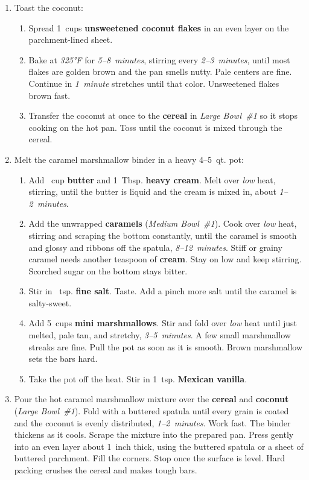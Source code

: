 \documentclass[11pt,letterpaper]{article}
\begin{document}
\begin{enumerate}
    \item Toast the coconut:
    \begin{enumerate}
        \item Spread 1~cups \textbf{unsweetened coconut flakes} in an even layer on the parchment-lined sheet.
        \item Bake at \textit{325°F} for \textit{5--8~minutes}, stirring every \textit{2--3~minutes}, until most flakes are golden brown and the pan smells nutty. Pale centers are fine. Continue in \textit{1~minute} stretches until that color. Unsweetened flakes brown fast.
        \item Transfer the coconut at once to the \textbf{cereal} in \textit{Large Bowl~\#1} so it stops cooking on the hot pan. Toss until the coconut is mixed through the cereal.
    \end{enumerate}

    \item Melt the caramel marshmallow binder in a heavy 4--5~qt. pot:
    \begin{enumerate}
        \item Add ~cup \textbf{butter} and 1~Tbsp. \textbf{heavy cream}. Melt over \textit{low} heat, stirring, until the butter is liquid and the cream is mixed in, about \textit{1--2~minutes}.
        \item Add the unwrapped \textbf{caramels} (\textit{Medium Bowl~\#1}). Cook over \textit{low} heat, stirring and scraping the bottom constantly, until the caramel is smooth and glossy and ribbons off the spatula, \textit{8--12~minutes}. Stiff or grainy caramel needs another teaspoon of \textbf{cream}. Stay on low and keep stirring. Scorched sugar on the bottom stays bitter.
        \item Stir in ~tsp. \textbf{fine salt}. Taste. Add a pinch more salt until the caramel is salty-sweet.
        \item Add 5~cups \textbf{mini marshmallows}. Stir and fold over \textit{low} heat until just melted, pale tan, and stretchy, \textit{3--5~minutes}. A few small marshmallow streaks are fine. Pull the pot as soon as it is smooth. Brown marshmallow sets the bars hard.
        \item Take the pot off the heat. Stir in 1~tsp. \textbf{Mexican vanilla}.
    \end{enumerate}

    \item Pour the hot caramel marshmallow mixture over the \textbf{cereal} and \textbf{coconut} (\textit{Large Bowl~\#1}). Fold with a buttered spatula until every grain is coated and the coconut is evenly distributed, \textit{1--2~minutes}. Work fast. The binder thickens as it cools. Scrape the mixture into the prepared pan. Press gently into an even layer about 1~inch thick, using the buttered spatula or a sheet of buttered parchment. Fill the corners. Stop once the surface is level. Hard packing crushes the cereal and makes tough bars.


\end{enumerate}
\end{document}

